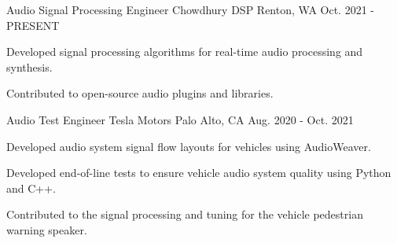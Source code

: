 

\begin{cventries}

  \cventry
    {Audio Signal Processing Engineer} %
    {Chowdhury DSP} %
    {Renton, WA} %
    {Oct. 2021 - PRESENT} %
    {
      \begin{cvitems} %
        \item {Developed signal processing algorithms for real-time audio processing and synthesis.}
        \item {Contributed to open-source audio plugins and libraries.}
      \end{cvitems}
    }

  \cventry
    {Audio Test Engineer} %
    {Tesla Motors} %
    {Palo Alto, CA} %
    {Aug. 2020 - Oct. 2021} %
    {
      \begin{cvitems} %
        \item {Developed audio system signal flow layouts for vehicles using AudioWeaver.}
        \item {Developed end-of-line tests to ensure vehicle audio system quality using Python and C++.}
        \item {Contributed to the signal processing and tuning for the vehicle pedestrian warning speaker.}
      \end{cvitems}
    }


\end{cventries}
